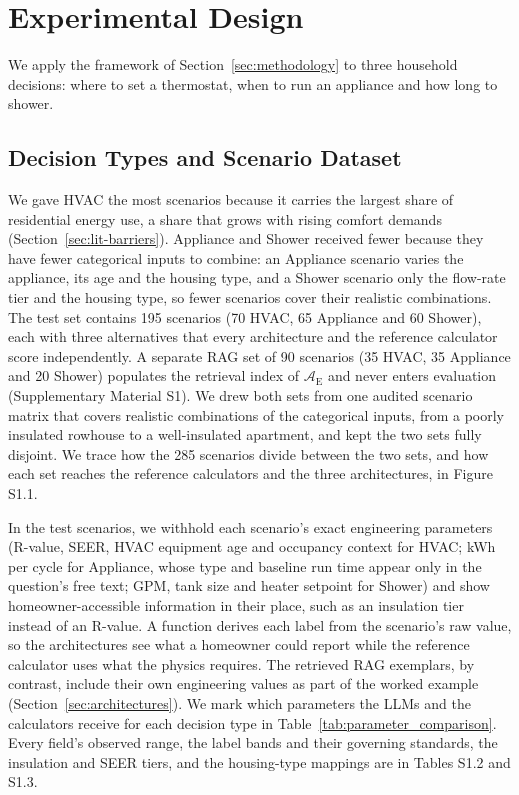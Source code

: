 \documentclass[final,3p,times]{elsarticle}
\begin{document}
\FloatBarrier

\section{Experimental Design}
\label{sec:experimental-design}

We apply the framework of Section~\ref{sec:methodology} to three household decisions: where to set a thermostat, when to run an appliance and how long to shower.

\subsection{Decision Types and Scenario Dataset}
\label{sec:dataset}
We gave HVAC the most scenarios because it carries the largest share of residential energy use, a share that grows with rising comfort demands (Section~\ref{sec:lit-barriers}). Appliance and Shower received fewer because they have fewer categorical inputs to combine: an Appliance scenario varies the appliance, its age and the housing type, and a Shower scenario only the flow-rate tier and the housing type, so fewer scenarios cover their realistic combinations. The test set contains 195 scenarios (70 HVAC, 65 Appliance and 60 Shower), each with three alternatives that every architecture and the reference calculator score independently. A separate RAG set of 90 scenarios (35 HVAC, 35 Appliance and 20 Shower) populates the retrieval index of $\mathcal{A}_{\text{E}}$ \cite{lewis2020} and never enters evaluation (Supplementary Material S1). We drew both sets from one audited scenario matrix that covers realistic combinations of the categorical inputs, from a poorly insulated rowhouse to a well-insulated apartment, and kept the two sets fully disjoint. We trace how the 285 scenarios divide between the two sets, and how each set reaches the reference calculators and the three architectures, in Figure S1.1.

In the test scenarios, we withhold each scenario's exact engineering parameters (R-value, SEER, HVAC equipment age and occupancy context for HVAC; kWh per cycle for Appliance, whose type and baseline run time appear only in the question's free text; GPM, tank size and heater setpoint for Shower) and show homeowner-accessible information in their place, such as an insulation tier instead of an R-value. A function derives each label from the scenario's raw value, so the architectures see what a homeowner could report while the reference calculator uses what the physics requires. The retrieved RAG exemplars, by contrast, include their own engineering values as part of the worked example (Section~\ref{sec:architectures}). We mark which parameters the LLMs and the calculators receive for each decision type in Table~\ref{tab:parameter_comparison}. Every field's observed range, the label bands and their governing standards, the insulation and SEER tiers, and the housing-type mappings are in Tables S1.2 and S1.3.
\end{document}

